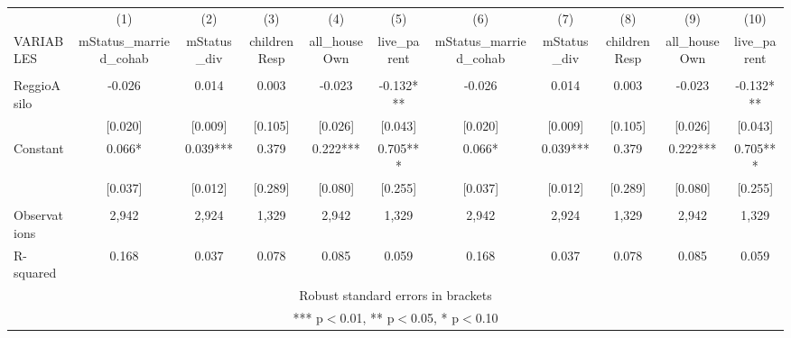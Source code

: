 \begin{tabular}{lcccccccccc} \hline
 & (1) & (2) & (3) & (4) & (5) & (6) & (7) & (8) & (9) & (10) \\
VARIABLES & mStatus\_married\_cohab & mStatus\_div & childrenResp & all\_houseOwn & live\_parent & mStatus\_married\_cohab & mStatus\_div & childrenResp & all\_houseOwn & live\_parent \\ \hline
 &  &  &  &  &  &  &  &  &  &  \\
ReggioAsilo & -0.026 & 0.014 & 0.003 & -0.023 & -0.132*** & -0.026 & 0.014 & 0.003 & -0.023 & -0.132*** \\
 & [0.020] & [0.009] & [0.105] & [0.026] & [0.043] & [0.020] & [0.009] & [0.105] & [0.026] & [0.043] \\
Constant & 0.066* & 0.039*** & 0.379 & 0.222*** & 0.705*** & 0.066* & 0.039*** & 0.379 & 0.222*** & 0.705*** \\
 & [0.037] & [0.012] & [0.289] & [0.080] & [0.255] & [0.037] & [0.012] & [0.289] & [0.080] & [0.255] \\
 &  &  &  &  &  &  &  &  &  &  \\
Observations & 2,942 & 2,924 & 1,329 & 2,942 & 1,329 & 2,942 & 2,924 & 1,329 & 2,942 & 1,329 \\
 R-squared & 0.168 & 0.037 & 0.078 & 0.085 & 0.059 & 0.168 & 0.037 & 0.078 & 0.085 & 0.059 \\ \hline
\multicolumn{11}{c}{ Robust standard errors in brackets} \\
\multicolumn{11}{c}{ *** p$<$0.01, ** p$<$0.05, * p$<$0.10} \\
\end{tabular}
